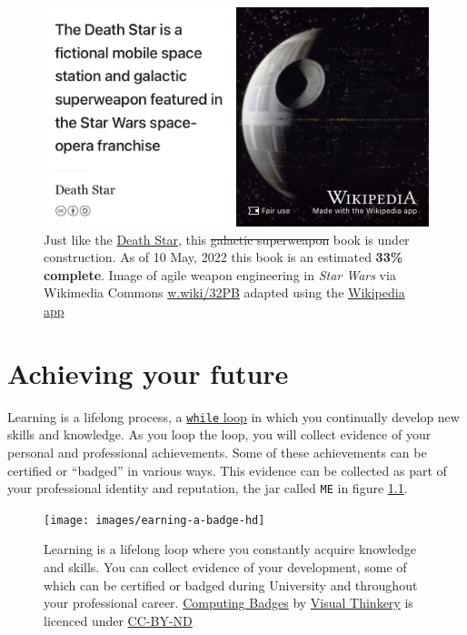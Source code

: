 \documentclass[
]{book}
\begin{document}
\begin{figure}

{\centering \includegraphics[width=0.99\linewidth]{images/DeathStar2} 

}

\caption{Just like the \href{https://en.wikipedia.org/wiki/Death_Star}{Death Star}, this \sout{galactic superweapon} book is under construction. As of 10 May, 2022 this book is an estimated \textbf{33\% complete}. Image of agile weapon engineering in \emph{Star Wars} via Wikimedia Commons \href{https://w.wiki/32PB}{w.wiki/32PB} adapted using the \href{https://apps.apple.com/gb/app/wikipedia/id324715238}{Wikipedia app}}\label{fig:deathstar7-fig}
\end{figure}

\hypertarget{achieving}{%
\chapter{Achieving your future}\label{achieving}}

Learning is a lifelong process, a \href{https://en.wikipedia.org/wiki/While_loop}{\texttt{while} loop} in which you continually develop new skills and knowledge. As you loop the loop, you will collect evidence of your personal and professional achievements. Some of these achievements can be certified or ``badged'' in various ways. This evidence can be collected as part of your professional identity and reputation, the jar called \texttt{ME} in figure \ref{fig:while-learning-fig}.

\begin{figure}

{\centering \texttt{[image: images/earning-a-badge-hd]} 

}

\caption{Learning is a lifelong loop where you constantly acquire knowledge and skills. You can collect evidence of your development, some of which can be certified or badged during University and throughout your professional career. \href{https://bryanmmathers.com/computing-badges/}{Computing Badges} by \href{https://visualthinkery.com/}{Visual Thinkery} is licenced under \href{https://creativecommons.org/licenses/by-nd/4.0/}{CC-BY-ND}}\label{fig:while-learning-fig}
\end{figure}
\end{document}
